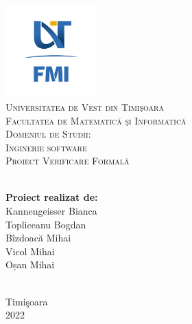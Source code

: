 \documentclass[12pt, a4paper]{report}
\begin{document}

\begin{titlepage}

\newcommand{\HRule}{\rule{\linewidth}{0.5mm}} 

\center 
\vspace{-20pt}
\includegraphics[width=100pt]{images/uvt_fmi_img.png}\\[1.0cm] 
 
\textsc{\LARGE Universitatea de Vest din Timi\c{s}oara}\\[0.5cm] 
\textsc{\Large Facultatea de Matematic\u{a} \c{s}i Informatic\u{a}}\\[0.5cm] 
\textsc{\large Domeniul de Studii: \\Inginerie software}\\[4cm] 

\textsc{\Huge Proiect Verificare Formală}\\[3,2cm]



~
\begin{minipage}{0.8\textwidth}
\begin{flushright} \large
\textbf{Proiect realizat de:} \\
Kannengeisser Bianca\\
Topliceanu Bogdan\\
Bîzdoacă Mihai\\
Vicol Mihai\\
Oșan Mihai

\end{flushright}
\end{minipage}\\[1cm]


\vfill
{\large Timi\c{s}oara \\2022}\\ 

 


\end{titlepage}
\end{document}
